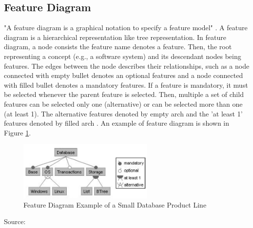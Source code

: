\subsection{Feature Diagram}\label{SecFD}
"A feature diagram is a graphical notation to specify a feature model"  \citep{book.apel.FeatureOrientedSoftware}. A feature diagram is a hierarchical representation like tree representation. In feature diagram, a node consists the feature name denotes a feature. Then, the root representing a concept (e.g., a software system) and its descendant nodes being features. The edges between the node describes their relationships, such as a node connected with empty bullet denotes an optional features and a node connected with filled bullet denotes a mandatory features. If a feature is mandatory, it must be selected whenever the parent feature is selected. Then, multiple a set of child features can be selected only one (alternative) or can be selected more than one (at least 1). The alternative features denoted by empty arch and the 'at least 1' features denoted by filled arch \citep{paper.kastnerApel.FeatureOrientedSoftwareDevelopment}. An example of feature diagram is shown in Figure \ref{fig:ExampleFD}.

\begin{figure}
	\centering
	\includegraphics[width=0.6\textwidth]
	{pics/ExampleFD.png}
	\caption{Feature Diagram Example of a Small Database Product Line}
	\label{fig:ExampleFD}
\end{figure}
\vspace{-1cm}
\begin{center}
	{\small Source: \citep{paper.kastnerApel.FeatureOrientedSoftwareDevelopment}}
\end{center}

